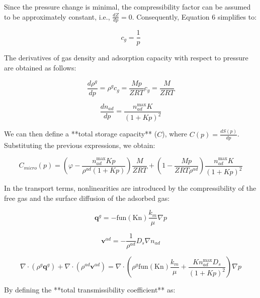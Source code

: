 \documentclass{article}
\begin{document}
Since the pressure change is minimal, the compressibility factor can be assumed to be approximately constant, i.e., $\frac{dZ}{dp} = 0$. Consequently, Equation 6 simplifies to:

\begin{equation}
    c_{g}=\frac{1}{p}
\end{equation}

The derivatives of gas density and adsorption capacity with respect to pressure are obtained as follows:

\begin{equation}
    \frac{d \rho^{g}}{d p}=\rho^{g} c_{g}=\frac{M p}{Z R T} c_{g}=\frac{M}{Z R T}
\end{equation}

\begin{equation}
    \frac{d n_{a d}}{d p}=\frac{n_{a d}^{\max } K}{(1+K p)^{2}}
\end{equation}

We can then define a **total storage capacity** ($C$), where $C(p) = \frac{dS(p)}{dp}$. Substituting the previous expressions, we obtain:

\begin{equation}
    C_{m i c r o}(p)=\left(\varphi-\frac{n_{a d}^{\max } K p}{\rho^{a d}(1+K p)}\right) \frac{M}{Z R T}+\left(1-\frac{M p}{Z R T \rho^{a d}}\right) \frac{n_{a d}^{\max } K}{(1+K p)^{2}}
\end{equation}

In the transport terms, nonlinearities are introduced by the compressibility of the free gas and the surface diffusion of the adsorbed gas:

\begin{equation}
    \mathbf{q}^{g}=-\text{fun}(\text{Kn}) \frac{k_{m}}{\mu} \nabla p
\end{equation}

\begin{equation}
    \mathbf{v}^{a d}=-\frac{1}{\rho^{a d}} D_{s} \nabla n_{a d}
\end{equation}

\begin{equation}
    \nabla \cdot\left(\rho^{g} \mathbf{q}^{g}\right)+\nabla \cdot\left(\rho^{a d} \mathbf{v}^{a d}\right)=\nabla \cdot\left(\rho^{g} \text{fun}(\text{Kn}) \frac{k_{m}}{\mu}+\frac{K n_{a d}^{\max } D_{s}}{(1+K p)^{2}}\right) \nabla p
\end{equation}

By defining the **total transmissibility coefficient** as:
\end{document}
